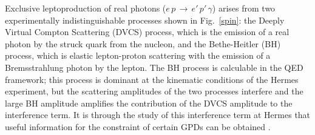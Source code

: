 Exclusive leptoproduction of real photons
($e\,p\,\rightarrow\,e'\,p'\,\gamma$) arises from
two experimentally indistinguishable processes shown in
Fig.~\ref{spin}: the Deeply Virtual Compton Scattering (DVCS) process,
which is the emission of a real photon by the struck quark from the nucleon, and the Bethe-Heitler (BH) process, which is elastic lepton-proton scattering with the
emission of a Bremsstrahlung photon by the lepton. 
The BH process is calculable in the QED framework; this process is
dominant at the kinematic conditions of the H{\sc ermes} experiment, but the
scattering amplitudes of the two processes interfere and the large BH amplitude
amplifies the contribution of the DVCS amplitude to the interference term. 
It is through the study of this interference term at H{\sc ermes} that
useful information for the constraint of certain GPDs can be obtained \cite{Bel02b}.

